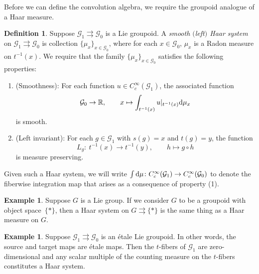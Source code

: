 \documentclass[pdftex]{sigma}
\numberwithin{equation}{section}
\theoremstyle{definition}
\newtheorem{Definition}[Theorem]{Definition}
\newtheorem{Example}[Theorem]{Example}
\newcommand{\BBR}{\mathbb{R}}
\newcommand{\CG}{\mathcal{G}}
\newcommand{\inv}{^{-1}}
\newcommand{\grpd}{\rightrightarrows}
\begin{document}
Before we can define the convolution algebra, we require the groupoid analogue of a Haar measure.
\begin{Definition}
Suppose $ \CG_1 \grpd \CG_0$ is a Lie groupoid. A \emph{smooth $($left$)$ Haar system} on $ \CG_1 \grpd \CG_0 $ is collection $ \{ \mu_x \}_{x \in \CG_0 } $, where for each $ x \in \CG_0 $, $ \mu_x$ is a Radon measure on $ t\inv(x) $. We require that the family $ \{ \mu_x \}_{x \in \CG_0} $ satisfies the following properties:
\begin{enumerate}\itemsep=0pt
  \item[(1)] (Smoothness): For each function $ u \in C_c^\infty(\CG_1) $, the associated function
  \[ \CG_0 \to \BBR, \qquad x \mapsto \int_{t\inv(x)} u|_{t\inv(x)} {\rm d} \mu_x  \]
  is smooth.
  \item[(2)] (Left invariant): For each $ g \in \CG_1 $ with $ s(g) = x$ and $ t(g) = y $, the function
  \[ L_g \colon\ t\inv(x) \to t\inv(y), \qquad h \mapsto g \circ h \]
  is measure preserving.
\end{enumerate}
\end{Definition}
Given such a Haar system, we will write $ \int {\rm d} \mu \colon C^\infty_c(\CG_1) \to C^\infty_c(\CG_0) $ to denote the fiberwise integration map that arises as a consequence of property (1).
\begin{Example}
Suppose $ G$ is a Lie group. If we consider $ G $ to be a groupoid with object space~$ \{ * \} $, then a Haar system on $ G \grpd \{ * \} $ is the same thing as a Haar measure on $ G $.
\end{Example}
\begin{Example}
   Suppose $ \CG_1 \grpd \CG_0 $ is an \'etale Lie groupoid. In other words, the source and target maps are \'etale maps. Then the $ t $-fibers of $ \CG_1 $ are zero-dimensional and any scalar multiple of the counting measure on the $ t $-fibers constitutes a Haar system.
\end{Example}
\end{document}
